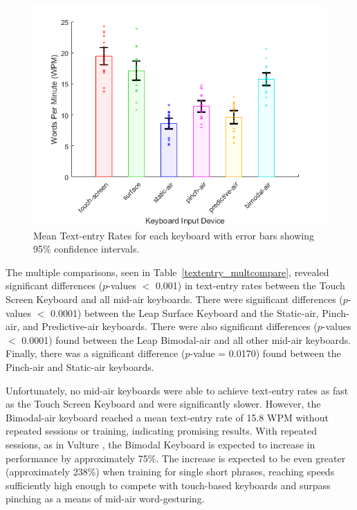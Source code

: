 \begin{figure}[!t]
	\centering
	\includegraphics{Figures/fig_textentry_mean}
	\caption[Mean Text-entry Rates]{Mean Text-entry Rates for each keyboard with error bars showing 95\% confidence intervals.}
	\label{fig_textentry_mean}
\end{figure}

The multiple comparisons, seen in Table~\ref{textentry_multcompare}, revealed significant differences ($p$-values $<$ 0.001) in text-entry rates between the Touch Screen Keyboard and all mid-air keyboards. There were significant differences ($p$-values $<$ 0.0001) between the Leap Surface Keyboard and the Static-air, Pinch-air, and Predictive-air keyboards. There were also significant differences ($p$-values $<$ 0.0001) found between the Leap Bimodal-air and all other mid-air keyboards. Finally, there was a significant difference ($p$-value = 0.0170) found between the Pinch-air and Static-air keyboards.

Unfortunately, no mid-air keyboards were able to achieve text-entry rates as fast as the Touch Screen Keyboard and were significantly slower. However, the Bimodal-air keyboard reached a mean text-entry rate of 15.8 WPM without repeated sessions or training, indicating promising results. With repeated sessions, as in Vulture \cite{ref_vulture}, the Bimodal Keyboard is expected to increase in performance by approximately 75\%. The increase is expected to be even greater (approximately 238\%) when training for single short phrases, reaching speeds sufficiently high enough to compete with touch-based keyboards and surpass pinching as a means of mid-air word-gesturing.

